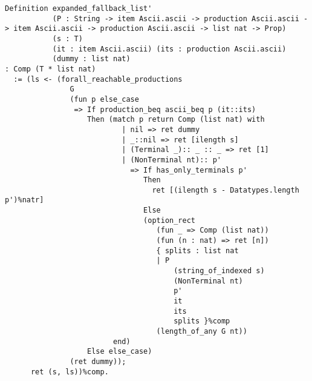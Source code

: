 \begin{verbatim}
Definition expanded_fallback_list'
           (P : String -> item Ascii.ascii -> production Ascii.ascii -> item Ascii.ascii -> production Ascii.ascii -> list nat -> Prop)
           (s : T)
           (it : item Ascii.ascii) (its : production Ascii.ascii)
           (dummy : list nat)
: Comp (T * list nat)
  := (ls <- (forall_reachable_productions
               G
               (fun p else_case
                => If production_beq ascii_beq p (it::its)
                   Then (match p return Comp (list nat) with
                           | nil => ret dummy
                           | _::nil => ret [ilength s]
                           | (Terminal _):: _ :: _ => ret [1]
                           | (NonTerminal nt):: p'
                             => If has_only_terminals p'
                                Then
                                  ret [(ilength s - Datatypes.length p')%natr]
                                Else
                                (option_rect
                                   (fun _ => Comp (list nat))
                                   (fun (n : nat) => ret [n])
                                   { splits : list nat
                                   | P
                                       (string_of_indexed s)
                                       (NonTerminal nt)
                                       p'
                                       it
                                       its
                                       splits }%comp
                                   (length_of_any G nt))
                         end)
                   Else else_case)
               (ret dummy));
      ret (s, ls))%comp.

\end{verbatim}


